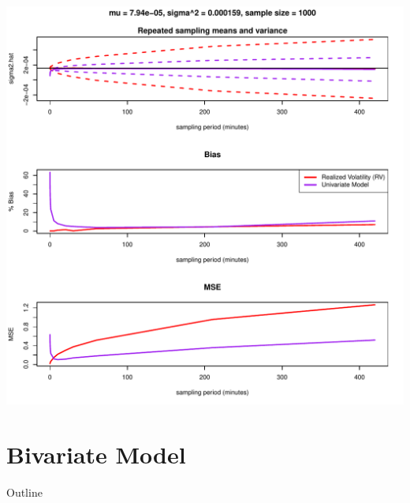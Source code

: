 \documentclass{beamer}
\begin{document}
\begin{frame}
	\centering
	\includegraphics[scale=0.45]{./section-2-figures/results-7-14-13-5-53.pdf}
\end{frame}


\section{Bivariate Model}

\begin{frame}{Outline}
  \tableofcontents[currentsection]
\end{frame}
\end{document}

